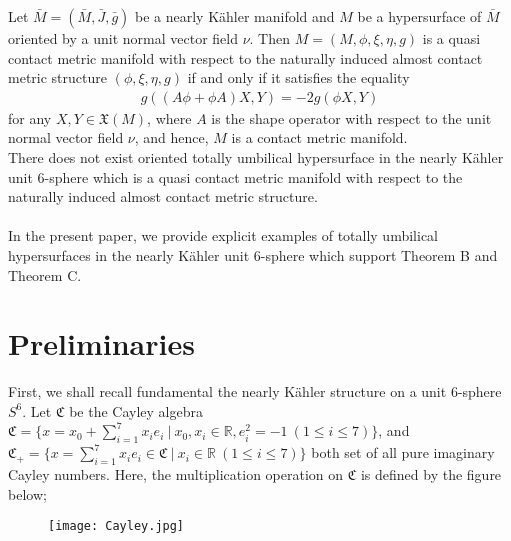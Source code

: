 \documentclass[12pt]{article}
\numberwithin{equation}{section}
\begin{document}
 Let $\bar{M}=(\bar{M},\bar{J},\bar{g})$
be a nearly K\"{a}hler manifold and $M$ be a
hypersurface of $\bar{M}$ oriented by a unit normal
vector field $\nu$. Then $M = (M,\phi,\xi,\eta, g)$ is
a quasi contact metric manifold with respect to the
naturally induced almost contact metric structure
$(\phi,\xi,\eta,g)$ if and only if it satisfies the equality
\begin{equation*}
\begin{split}
g((A\phi +\phi A)X, Y) = -2g(\phi X, Y)
\end{split}
\end{equation*}
for any $X,Y\in \mathfrak{X}(M)$, where $A$ is the
shape operator with respect to the unit normal vector
field $\nu$, and hence, $M$ is a contact metric manifold.
\\

 There does not exist oriented totally umbilical hypersurface in the nearly {K\"ahler} unit $6$-sphere which is a quasi contact metric manifold with respect to the naturally induced almost contact metric structure.\\
\\
In the present paper, we provide explicit examples of totally
umbilical hypersurfaces in the nearly {K\"ahler} unit $6$-sphere
which support Theorem B and Theorem C.



\section{Preliminaries}\label{sec2}
First, we shall recall fundamental the nearly {K\"ahler} structure
on a unit $6$-sphere $S^{6}$. Let $\mathfrak{C}$ be the Cayley
algebra $\mathfrak{C}=\{x=x_{0}+\sum_{i=1}^{7}x_{i}e_{i}~|~x_{0},
x_{i}\in \mathbb{R}, e_{i}^{2}=-1~(1\leq i \leq7)\}$, and
$\mathfrak{C}_{+}=\{x = \sum_{i=1}^{7}x_{i}e_{i} \in
\mathfrak{C}~|~x_{i}\in \mathbb{R}~(1\leq i \leq 7)\}$ both set of
all pure imaginary Cayley numbers. Here, the multiplication
operation on $\mathfrak{C}$ is defined by the figure below;
\begin{figure}\label{21}
\centering
\texttt{[image: Cayley.jpg]}\\
\caption{} \label{21}
\end{figure}
\end{document}
